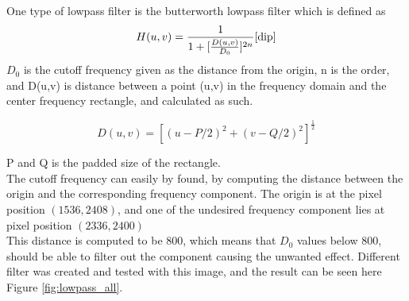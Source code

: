 One type of lowpass filter is the butterworth lowpass filter which is defined as
\begin{equation}
	H(u,v) = \frac{1}{1+[\frac{D(u,v)}{D_0}]^{2n}}
	\label{eq:LBP}
	\cite{dip}
\end{equation}
$D_0$ is the cutoff frequency given as the distance from the origin, n  is the order,  and D(u,v) is distance between a point (u,v) in the frequency domain and the center frequency rectangle, and  calculated as such.

\begin{equation}
D(u,v) = [(u-P/2)^2 + (v-Q/2)^2]^{\frac{1}{2}} 
\end{equation}

P and Q is the padded size of the rectangle. \\


The cutoff frequency can easily by found, by computing the distance between the origin and the corresponding frequency component. The origin is at the pixel position $(1536 ,2408)$, and one of the undesired frequency component lies at pixel position $(2336,2400)$ \\


This distance is computed to be 800, which means that $D_0$ values below 800, should be able to filter out the component causing the unwanted effect.  Different filter was created and tested with this image, and the result can be  seen here Figure \ref{fig:lowpass_all}.  \\

